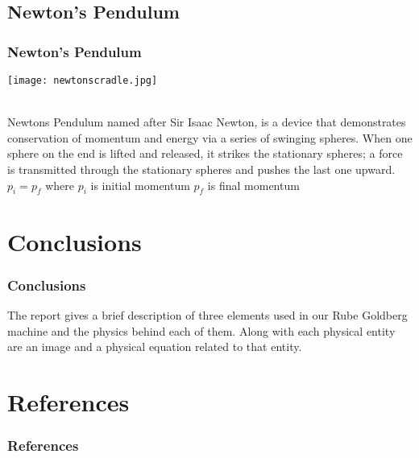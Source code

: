 \subsection{Newton's Pendulum}
\begin{frame}
  \frametitle{Newton's Pendulum}
  \begin{center}
  \texttt{[image: newtonscradle.jpg]}
  \end{center}
  \\
   Newtons Pendulum named after Sir Isaac Newton, is a device that demonstrates conservation of momentum and energy via a series of swinging spheres. When one sphere on the end is lifted and released, it strikes the stationary spheres; a force is transmitted through the stationary spheres and pushes the last one upward.
\linebreak
\(
p_i = p_f
\)
\linebreak
where
\linebreak
\(
p_i
\)
  is initial momentum
\linebreak
\(
p_f
\)
  is final momentum
\end{frame}

\section{Conclusions}
\begin{frame}
	\frametitle{Conclusions}
The report gives a brief description of three elements used in our Rube Goldberg machine and the physics behind each of them. Along with each physical entity are an image and a physical equation related to that entity.
\end{frame}

\section{References}
\begin{frame}
	\frametitle{References}
	
	{}
	\cite{wiki:000} \\ 
	\cite{wiki:001} \\ 
	\cite{wiki:002} 
\end{frame}


